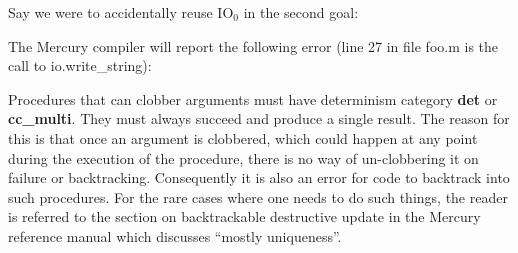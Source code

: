 \documentclass[a4paper,11pt,notitlepage,onecolumn]{book}
\begin{document}
Say we were to accidentally reuse \textsf{IO$_{0}$} in the second goal:

\begin{small}

\begin{ptabular}
\nextline
{}
\nextline
{}
\nextline
\end{ptabular}

\end{small}

The Mercury compiler will report the following error
(line 27 in file \textsf{foo.m} is the call to \textsf{io.write\_string}):

\begin{small}

\begin{ptabular}
\nextline
{}
\nextline
{}
\nextline
{}
\nextline
\end{ptabular}

\end{small}

\Note Procedures that can clobber arguments must have determinism category
\textsf{\textbf{det}} or \textsf{\textbf{cc\_multi}}.  They must always succeed and produce a single result.
The reason for this is that once an argument is clobbered, which could
happen at any point during the execution of the procedure, there is no way
of un-clobbering it on failure or backtracking.  Consequently it is also an
error for code to backtrack into such procedures.  For the rare cases where
one needs to do such things, the reader is referred to the section on
backtrackable destructive update in the Mercury reference manual which
discusses ``mostly uniqueness''.
\end{document}
